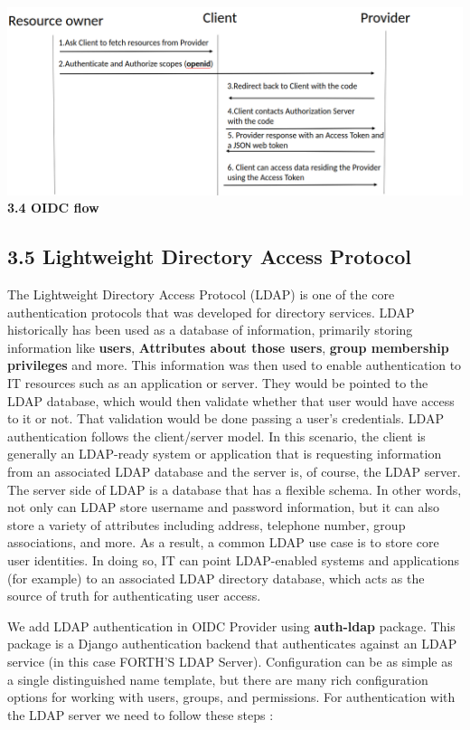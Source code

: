 \begin{center}
	\includegraphics[scale=0.4]{figures/OIDC.png}\\
	\textcolor{OIDC}{\textbf{3.4 OIDC flow}}
	
\end{center}


\subsection*{3.5 Lightweight Directory Access Protocol}

The Lightweight Directory Access Protocol (LDAP) is one of the core authentication protocols that was developed for directory services. LDAP historically has been used as a database of information, primarily storing information like \textbf{users}, \textbf{Attributes about those users}, \textbf{group membership privileges} and more. This information was then used to enable authentication to IT resources such as an application or server. They would be pointed to the LDAP database, which would then validate whether that user would have access to it or not. That validation would be done passing a user’s credentials. LDAP authentication follows the client/server model. In this scenario, the client is generally an LDAP-ready system or application that is requesting information from an associated LDAP database and the server is, of course, the LDAP server. The server side of LDAP is a database that has a flexible schema. In other words, not only can LDAP store username and password information, but it can also store a variety of attributes including address, telephone number, group associations, and more. As a result, a common LDAP use case is to store core user identities. In doing so, IT can point LDAP-enabled systems and applications (for example) to an associated LDAP directory database, which acts as the source of truth for authenticating user access. 


We add LDAP authentication in OIDC Provider using \textbf{auth-ldap} package. This package  is a Django authentication backend that authenticates against an LDAP service (in this case FORTH'S LDAP Server). Configuration can be as simple as a single distinguished name template, but there are many rich configuration options for working with users, groups, and permissions. For authentication with the LDAP server we need to follow these steps : 

